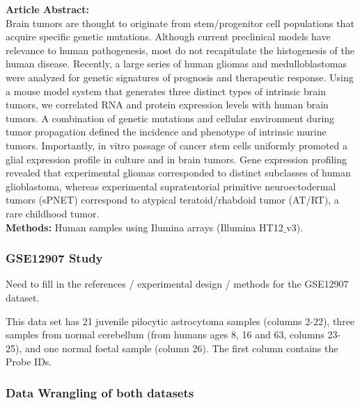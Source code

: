 \documentclass{article}\usepackage[]{graphicx}\usepackage[]{color}
\begin{document}
{\bf Article Abstract:}\\
Brain tumors are thought to originate from stem/progenitor cell populations that acquire specific genetic mutations. Although current preclinical models have relevance to human pathogenesis, most do not recapitulate the histogenesis of the human disease. Recently, a large series of human gliomas and medulloblastomas were analyzed for genetic signatures of prognosis and therapeutic response. Using a mouse model system that generates three distinct types of intrinsic brain tumors, we correlated RNA and protein expression levels with human brain tumors. A combination of genetic mutations and cellular environment during tumor propagation defined the incidence and phenotype of intrinsic murine tumors. Importantly, in vitro passage of cancer stem cells uniformly promoted a glial expression profile in culture and in brain tumors. Gene expression profiling revealed that experimental gliomas corresponded to distinct subclasses of human glioblastoma, whereas experimental supratentorial primitive neuroectodermal tumors (sPNET) correspond to atypical teratoid/rhabdoid tumor (AT/RT), a rare childhood tumor.\\

{\bf Methods:} Human samples using Ilumina arrays (Illumina HT12$\_$v3).



\subsubsection{GSE12907 Study}

Need to fill in the references / experimental design / methods for the GSE12907 dataset.

This data set has 21 juvenile pilocytic astrocytoma samples (columns 2-22), three samples from normal cerebellum (from humans ages 8, 16 and 63, columns 23-25), and one normal foetal sample (column 26).  The first column contains the Probe IDs.


\subsubsection{Data Wrangling of both datasets}
\end{document}

